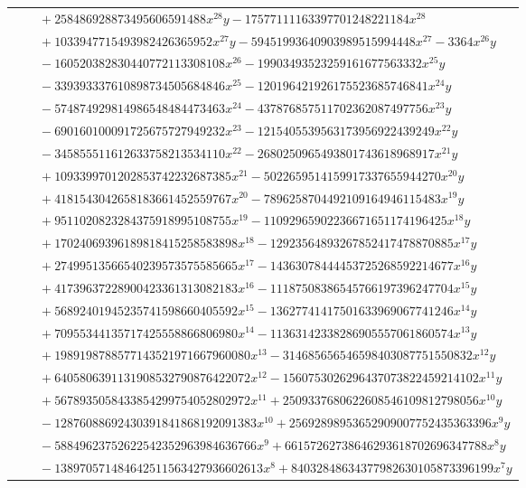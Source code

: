 \documentclass[11pt]{article}
\begin{document}
\begin{longtable}{@{}ll@{}}
 & $\quad +258486928873495606591488x^{28}y-17577111163397701248221184x^{28}$\\
 & $\quad +1033947715493982426365952x^{27}y-59451993640903989515994448x^{27}-3364x^{26}y$\\
 & $\quad -160520382830440772113308108x^{26}-19903493523259161677563332x^{25}y$\\
 & $\quad -339393337610898734505684846x^{25}-120196421926175523685746841x^{24}y$\\
 & $\quad -574874929814986548484473463x^{24}-437876857511702362087497756x^{23}y$\\
 & $\quad -690160100091725675727949232x^{23}-1215405539563173956922439249x^{22}y$\\
 & $\quad -345855511612633758213534110x^{22}-2680250965493801743618968917x^{21}y$\\
 & $\quad +1093399701202853742232687385x^{21}-5022659514159917337655944270x^{20}y$\\
 & $\quad +4181543042658183661452559767x^{20}-7896258704492109164946115483x^{19}y$\\
 & $\quad +9511020823284375918995108755x^{19}-11092965902236671651174196425x^{18}y$\\
 & $\quad +17024069396189818415258583898x^{18}-12923564893267852417478870885x^{17}y$\\
 & $\quad +27499513566540239573575585665x^{17}-14363078444453725268592214677x^{16}y$\\
 & $\quad +41739637228900423361313082183x^{16}-11187508386545766197396247704x^{15}y$\\
 & $\quad +56892401945235741598660405592x^{15}-13627741417501633969067741246x^{14}y$\\
 & $\quad +70955344135717425558866806980x^{14}-11363142338286905557061860574x^{13}y$\\
 & $\quad +1989198788577143521971667960080x^{13}-314685656546598403087751550832x^{12}y$\\
 & $\quad +6405806391131908532790876422072x^{12}-1560753026296437073822459214102x^{11}y$\\
 & $\quad +5678935058433854299754052802972x^{11}+2509337680622608546109812798056x^{10}y$\\
 & $\quad -12876088692430391841868192091383x^{10}+25692898953652909007752435363396x^{9}y$\\
 & $\quad -58849623752622542352963984636766x^{9}+66157262738646293618702696347788x^{8}y$\\
 & $\quad -138970571484642511563427936602613x^{8}+84032848634377982630105873396199x^{7}y$\\

\end{longtable}
\end{document}
